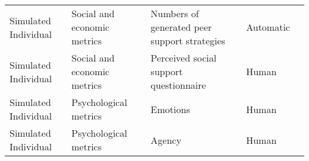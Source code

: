 \begin{small}
\begin{center}
\begin{longtable}{@{}p{}p{}p{}p{}p{}@{}}
Simulated Individual     & Social and economic metrics         & Numbers of generated peer support strategies                                                                                                                                                                & Automatic & \cite{Liu2024ComPeerAG}                                                                                                                                                                                                                                                                                                                                                                              \\
Simulated Individual     & Social and economic metrics         & Perceived social support questionnaire                                                                                                                                                                      & Human     & \cite{Liu2024ComPeerAG}                                                                                                                                                                                                                                                                                                                                                                              \\
Simulated Individual     & Psychological metrics & Emotions                                                                                                                                                                                                    & Human     & \cite{Pataranutaporn2024FutureYA}                                                                                                                                                                                                                                                                                                                                                                                                  \\
Simulated Individual     & Psychological metrics & Agency                                                                                                                                                                                                      & Human     & \cite{Pataranutaporn2024FutureYA}                                                                                                                                                                                                                                                                                                                                                                                                  \\

\end{longtable}
\end{center}
\end{small}
